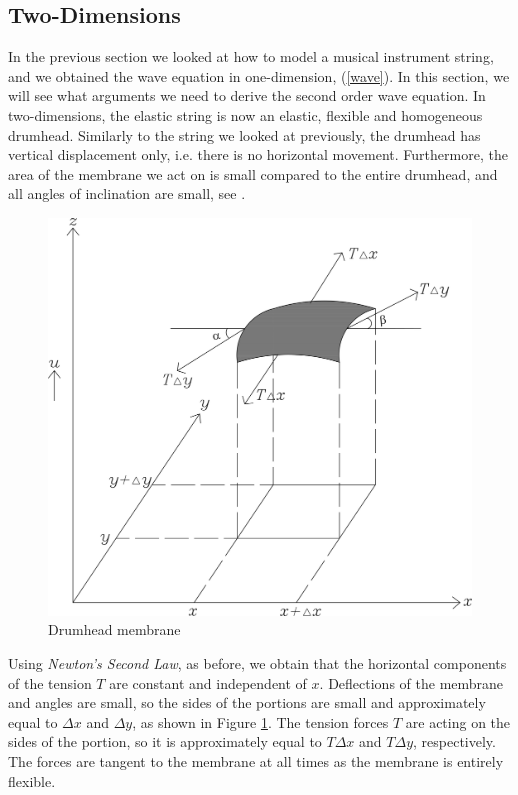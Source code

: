 \documentclass[a4paper, 12pt]{article}
\numberwithin{equation}{section}
\begin{document}
\subsection{Two-Dimensions} \label{twodim}
In the previous section we looked at how to model a musical instrument string, and we obtained the wave equation in 
one-dimension, (\ref{wave}). In this section, we will see what arguments we need to derive the second order wave equation.
In two-dimensions, the elastic string is now an elastic, flexible and homogeneous drumhead. Similarly to the string we looked at previously, 
the drumhead has vertical displacement only, i.e. there is no horizontal movement. Furthermore, the area of the membrane we act on is small
compared to the entire drumhead, and all angles of inclination are small, see \cite{Kr}.

\begin{figure}[h]
    \centering
    \includegraphics[scale=0.5]{images/grafic-5} 
    \caption{Drumhead membrane}
    \label{fig:2}
\end{figure}

Using \emph{Newton's Second Law}, as before, we obtain that the horizontal components of the tension $T$ are constant and independent of $x$.
Deflections of the membrane and angles are small, so the sides of the portions are small and approximately equal to $\Delta x$ and $\Delta y$, 
as shown in Figure \ref{fig:2}. The tension forces $T$ are acting on the sides of the portion, so it is approximately equal to $T\Delta x$ and $T\Delta y$, 
respectively. The forces are tangent to the membrane at all times as the membrane is entirely flexible.
\\
\end{document}
